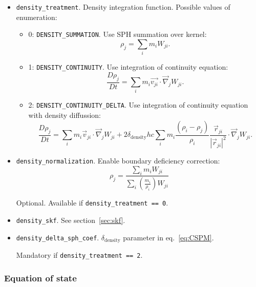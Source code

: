 \begin{itemize}
    \item \verb|density_treatment|. Density integration function. Possible values of enumeration:
    \begin{itemize}
        \item 0: \verb|DENSITY_SUMMATION|. Use SPH summation over kernel:
        \begin{equation}
            \rho_{j} = \sum\limits_{i} m_{i} W_{ji}.
        \end{equation}

        \item 1: \verb|DENSITY_CONTINUITY|. Use integration of continuity equation:
        \begin{equation}
            \frac{D\rho_{j}}{Dt} = \sum\limits_{i} m_{i} \vec{v_{ji}} \cdot \vec{\nabla}_{j} W_{ji}.
        \end{equation}

        \item 2: \verb|DENSITY_CONTINUITY_DELTA|. Use integration of continuity equation with density diffussion:
        \begin{equation}\label{eq:CSPM}
             \frac{D\rho_{j}}{Dt} = \sum\limits_{i} m_{i} \vec{v}_{ji} \cdot \vec{\nabla}_{j} W_{ji} + 
             2\delta_{\text{density}} h c
             \sum\limits_{i}m_{i} \frac{(\rho_{i} - \rho_{j})}{\rho_{i}} \frac{\vec{r}_{ji}}{|\vec{r}_{ji}|^2} \cdot \vec{\nabla}_{j} W_{ji}.
        \end{equation}
    \end{itemize}

    \item \verb|density_normalization|. Enable boundary deficiency correction:
    \begin{equation}
        \rho_{j} = \frac{
        \sum\limits_{i}m_{i}W_{ji}
        }{
        \sum\limits_{i}
        \left(\frac{m_{i}}{\rho_{i}}\right) W_{ji}
        }
    \end{equation}

    Optional. Available if \verb|density_treatment == 0|.
    \item \verb|density_skf|. See section~\ref{sec:skf}.
    \item \verb|density_delta_sph_coef|. $\delta_{\text{density}}$ parameter in eq.~\ref{eq:CSPM}.
    
    Mandatory if \verb|density_treatment == 2|.
\end{itemize}

\subsubsection{Equation of state}

